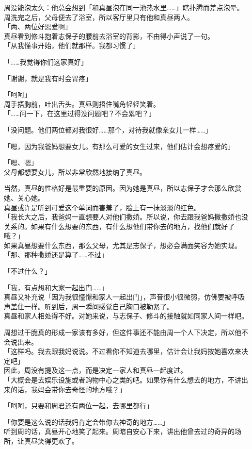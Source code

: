 周没能泡太久：他总会想到「和真昼泡在同一池热水里……」瞎扑腾而差点泡晕。\\

周洗完之后，父母便去了浴室，所以客厅里只有他和真昼两人。\\

「两、两位好恩爱啊」\\

真昼看到修斗抱着志保子的腰前去浴室的背影，不由得小声说了一句。\\

「从我懂事开始，他们就那样。我都习惯了」

「……我觉得你们这家真好」

「谢谢，就是我有时会胃疼」

「呵呵」\\

周手捂胸前，吐出舌头。真昼则捂住嘴角轻轻笑着。\\

「……问一下，在这里过得没问题吧？不会累吧？」

「没问题。他们两位都对我很好……那个，对待我就像亲女儿一样……」

「嗯，因为我爸妈想要女儿。有那么可爱的女生过来，他们估计会想疼爱的」

「嗯、嗯」\\

父母都想要女儿，所以非常欣然地接纳了真昼。

当然，真昼的性格好是最重要的原因。因为她是真昼，所以志保子才会那么欣赏她、关心她。\\

真昼或许是听到可爱这个单词而害羞了，脸上有一抹淡淡的红色。\\

「我长大之后，我爸妈一直想要人对他们撒娇。所以说，你去跟我爸妈撒撒娇也没关系的。如果有什么想要的东西，有什么想他们带你去的地方，找他们就好了哦？」\\

如果真昼想要什么东西，那么父母，尤其是志保子，想必会满面笑容为她实现。\\

「那、那种撒娇还是算了……不过」

「不过什么？」

「我，有点想和大家一起出门……」\\

真昼又补充说「因为我很憧憬和家人一起出门」，声音很小很微弱，仿佛要被呼吸声盖住一样。听到后，周一瞬间感觉自己胸口被勒紧了。\\

真昼和家人相处得不好。对她来说，与志保子、修斗的接触就如同家人间一样吧。

周想过干脆真的形成一家该有多好，但这件事还不能由周一个人下决定，所以他不会说出来。\\

「这样吗。我去跟我妈说说。不过看你不知道去哪里，估计会让我妈按她喜欢来决定吧」\\

因此，周没有提及这一点，而是决定一家人和真昼一起度过。\\

「大概会是去娱乐设施或者购物中心之类的吧。如果你有什么想去的地方，不讲出来的话，我妈会带你去奇怪的地方哦？」

「呵呵，只要和周君还有两位一起，去哪里都行」

「你要是这么说的话我妈肯定会带你去神奇的地方……」\\

听到周的话，真昼开心地笑了起来。周暗自安心下来，讲出他曾去过的奇异的场所，让真昼笑得更欢了。
